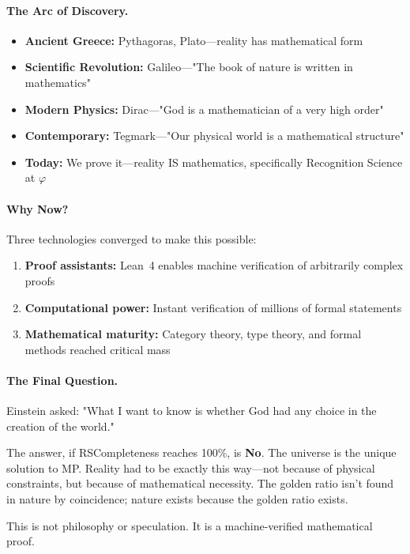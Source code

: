 \documentclass[11pt,a4paper,twoside]{article}
\numberwithin{equation}{section}
\theoremstyle{customthm}
\theoremstyle{customdef}
\theoremstyle{customrem}
\begin{document}
\paragraph{The Arc of Discovery.}
\begin{itemize}[leftmargin=*,topsep=2pt,itemsep=2pt]
\item \textbf{Ancient Greece:} Pythagoras, Plato—reality has mathematical form
\item \textbf{Scientific Revolution:} Galileo—"The book of nature is written in mathematics"
\item \textbf{Modern Physics:} Dirac—"God is a mathematician of a very high order"
\item \textbf{Contemporary:} Tegmark—"Our physical world is a mathematical structure"
\item \textbf{Today:} We prove it—reality IS mathematics, specifically Recognition Science at $\varphi$
\end{itemize}

\paragraph{Why Now?} Three technologies converged to make this possible:
\begin{enumerate}[leftmargin=*,topsep=2pt,itemsep=2pt]
\item \textbf{Proof assistants:} Lean~4 enables machine verification of arbitrarily complex proofs
\item \textbf{Computational power:} Instant verification of millions of formal statements
\item \textbf{Mathematical maturity:} Category theory, type theory, and formal methods reached critical mass
\end{enumerate}

\paragraph{The Final Question.} Einstein asked: "What I want to know is whether God had any choice in the creation of the world."

The answer, if RSCompleteness reaches 100\%, is \textbf{No}. The universe is the unique solution to MP. Reality had to be exactly this way—not because of physical constraints, but because of mathematical necessity. The golden ratio isn't found in nature by coincidence; nature exists because the golden ratio exists.

This is not philosophy or speculation. It is a machine-verified mathematical proof.
\end{document}

